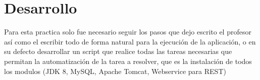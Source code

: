 \documentclass[10pt,executivepaper]{article}
\begin{document}
\begin{center}
	\par{}
\par{}
\par{}
\par\vspace{2cm}{
	Ultima fecha modificado: \today
}
\end{center}

\clearpage
\section{Desarrollo}
Para esta practica solo fue necesario seguir los pasos que dejo escrito el profesor así como el escribir todo de forma natural para la ejecución de la aplicación, o en su defecto desarrollar un script que realice todas las tareas necesarias que permitan la automatización de la tarea a resolver, que es la instalación de todos los modulos (JDK 8, MySQL, Apache Tomcat, Webservice para REST)
\end{document}

